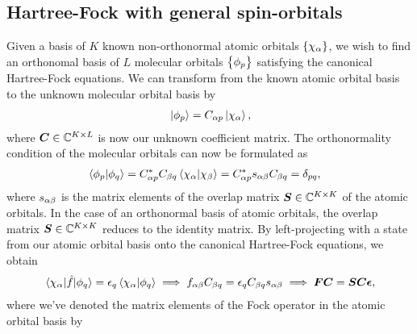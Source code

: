         \subsection{Hartree-Fock with general spin-orbitals}
            \label{subsec:ghf}
            Given a basis of $K$ known non-orthonormal atomic orbitals
            $\left\{ \chi_{\alpha} \right\}$, we wish to find an orthonomal basis of $L$
            molecular orbitals $\left\{ \phi_{p} \right\}$ satisfying the canonical
            Hartree-Fock equations.
            We can transform from the known atomic orbital basis to the unknown
            molecular orbital basis by
            \begin{align}
                \ket*{\phi_p} = C_{\alpha p}\ket{\chi_{\alpha}},
            \end{align}
            where $\boldsymbol{C} \in \mathbb{C}^{K\times L}$ is now our unknown
            coefficient matrix.
            The orthonormality condition of the molecular orbitals can now be
            formulated as
            \begin{align}
                \braket*{\phi_p}{\phi_q}
                &= C^{*}_{\alpha p} C_{\beta q}
                \braket*{\chi_{\alpha}}{\chi_{\beta}}
                = C^{*}_{\alpha p} s_{\alpha \beta}
                C_{\beta q}
                = \delta_{pq},
            \end{align}
            where $s_{\alpha\beta}$ is the matrix elements of the
            overlap matrix $\boldsymbol{S} \in \mathbb{C}^{K\times K}$ of the
            atomic orbitals.
            In the case of an orthonormal basis of atomic orbitals, the overlap
            matrix $\boldsymbol{S} \in \mathbb{C}^{K \times K}$ reduces to the identity
            matrix.
            By left-projecting with a state from our atomic orbital basis onto
            the canonical Hartree-Fock equations, we obtain
            \begin{gather}
                \mel*{\chi_{\alpha}}{\hat{f}}{\phi_q}
                = \epsilon_{q} \braket*{\chi_{\alpha}}{\phi_q}
                \implies
                f_{\alpha\beta}
                C_{\beta q}
                = \epsilon_q C_{\beta q} s_{\alpha \beta}
                \implies
                \boldsymbol{F} \boldsymbol{C} = \boldsymbol{S} \boldsymbol{C} \boldsymbol{\epsilon},
                \label{eq:roothan-hall-general}
            \end{gather}
            where we've denoted the matrix elements of the Fock operator in the
            atomic orbital basis by
